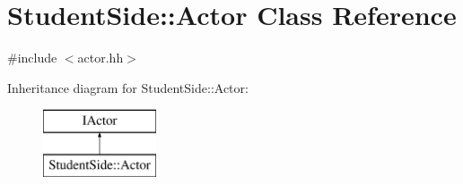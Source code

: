 \hypertarget{class_student_side_1_1_actor}{\section{Student\-Side\-:\-:Actor Class Reference}
\label{class_student_side_1_1_actor}
}


{\ttfamily \#include $<$actor.\-hh$>$}

Inheritance diagram for Student\-Side\-:\-:Actor\-:\begin{figure}[H]
\begin{center}
\leavevmode
\includegraphics[height=2.000000cm]{class_student_side_1_1_actor}
\end{center}
\end{figure}
